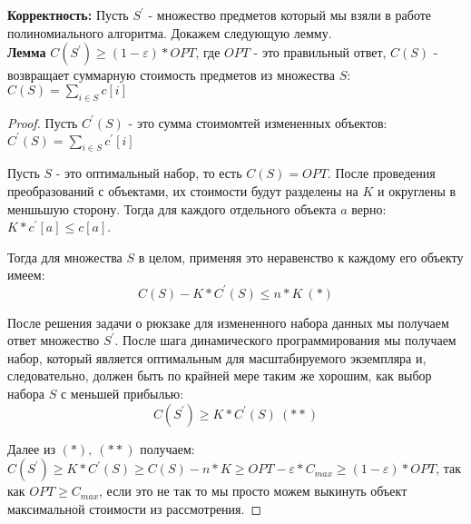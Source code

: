 \documentclass[a4paper,12pt]{extarticle}
\begin{document}
\textbf{Корректность:} 
Пусть $S^{'}$ - множество предметов который мы взяли в работе полиномиального алгоритма. Докажем следующую лемму. \\
\textbf{Лемма} 
$C(S^{'}) \geq (1 -\varepsilon ) * OPT$, где $OPT$ - это правильный ответ, $C(S)$ - возвращает суммарную стоимость предметов из множества $S$: $C(S) = \sum_{i \in S} c[i]$
\begin{proof}
	Пусть $C^{'}(S)$ - это сумма стоимомтей измененных объектов: $C^{'}(S) = \sum_{i \in S} c^{'}[i]$

	Пусть $S$ - это оптимальный набор, то есть $C(S) = OPT$. После проведения преобразований с объектами, их стоимости будут разделены на $K$ и округлены в меншьшую сторону. Тогда для каждого отдельного объекта $a$ верно: $K*c^{'}[a] \leq c[a]$.

	Тогда для множества $S$ в целом, применяя это неравенство к каждому его объекту имеем: 
	$$ C(S) - K * C^{'}(S) \leq n * K \ (*)$$

	После решения задачи о рюкзаке для измененного набора данных мы получаем ответ множество $S^{'}$. После шага динамического программирования мы получаем набор, который является оптимальным для масштабируемого экземпляра
	и, следовательно, должен быть по крайней мере таким же хорошим, как выбор набора $S$ с меньшей прибылью:
	$$C(S^{'}) \geq K * C^{'}(S)\ (**)$$

	Далее из $(*),\ (**)$ получаем: $C(S^{'}) \geq K * C^{'}(S) \geq C(S) - n * K \geq OPT - \varepsilon * C_{max} \geq (1 - \varepsilon)*OPT$, так как $OPT \geq C_{max}$, если это не так то мы просто можем выкинуть объект максимальной стоимости из рассмотрения.
\end{proof}
\end{document}
